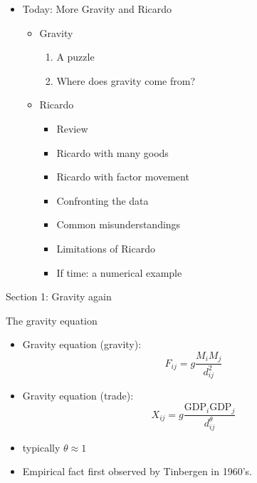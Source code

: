 \documentclass[ignorenonframetext,]{beamer}
\begin{document}
\begin{frame}

\begin{itemize}
\itemsep1pt\parskip0pt
\item
  Today: More Gravity and Ricardo
  \begin{itemize}
        \item Gravity
        \begin{enumerate}
            \item A puzzle
            \item Where does gravity come from?
        \end{enumerate}
        \item Ricardo
        \begin{itemize}
            \item Review
            \item Ricardo with many goods 
            \item Ricardo with factor movement 
            \item Confronting the data 
            \item Common misunderstandings
            \item Limitations of Ricardo
            \item If time: a numerical example
        \end{itemize}
  \end{itemize}
\end{itemize}

\end{frame}

\begin{frame}

    Section 1: Gravity again 

\end{frame}

\begin{frame}{The gravity equation}
    
    \begin{itemize}
        \item Gravity equation (gravity):
        \begin{equation*}
            F_{ij} = g \frac{M_i M_j}{d_{ij}^2}
        \end{equation*}
        \item Gravity equation (trade):
        \begin{equation*}
            X_{ij} = g \frac{\mbox{GDP}_i \mbox{GDP}_j}{d_{ij}^\theta}
        \end{equation*}
        \item typically $\theta \approx 1$
        \item Empirical fact first observed by Tinbergen in 1960's.
    \end{itemize}

\end{frame}
\end{document}
